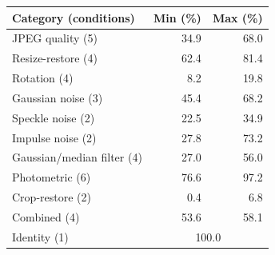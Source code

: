 \begin{tabular}{lrr}
\toprule
\textbf{Category (conditions)} & \textbf{Min (\%)} & \textbf{Max (\%)} \\
\midrule
JPEG quality (5) & 34.9 & 68.0 \\
Resize-restore (4) & 62.4 & 81.4 \\
Rotation (4) & 8.2 & 19.8 \\
Gaussian noise (3) & 45.4 & 68.2 \\
Speckle noise (2) & 22.5 & 34.9 \\
Impulse noise (2) & 27.8 & 73.2 \\
Gaussian/median filter (4) & 27.0 & 56.0 \\
Photometric (6) & 76.6 & 97.2 \\
Crop-restore (2) & 0.4 & 6.8 \\
Combined (4) & 53.6 & 58.1 \\
Identity (1) & \multicolumn{2}{c}{100.0} \\
\bottomrule
\end{tabular}
